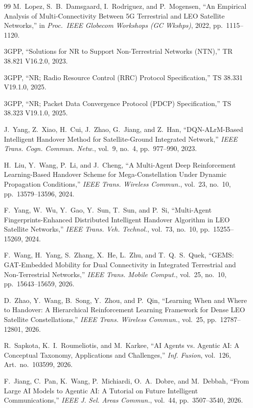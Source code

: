 \documentclass[journal]{IEEEtran}
\begin{document}
\begin{thebibliography}{99}
M.~Lopez, S.~B.~Damsgaard, I.~Rodriguez, and P.~Mogensen, ``An Empirical Analysis of Multi-Connectivity Between 5G Terrestrial and LEO Satellite Networks,'' in \emph{Proc.\ IEEE Globecom Workshops (GC Wkshps)}, 2022, pp.~1115--1120.

3GPP, ``Solutions for NR to Support Non-Terrestrial Networks (NTN),'' TR 38.821 V16.2.0, 2023.

3GPP, ``NR; Radio Resource Control (RRC) Protocol Specification,'' TS 38.331 V19.1.0, 2025.

3GPP, ``NR; Packet Data Convergence Protocol (PDCP) Specification,'' TS 38.323 V19.1.0, 2025.

J.~Yang, Z.~Xiao, H.~Cui, J.~Zhao, G.~Jiang, and Z.~Han, ``DQN-ALrM-Based Intelligent Handover Method for Satellite-Ground Integrated Network,'' \emph{IEEE Trans. Cogn. Commun. Netw.}, vol.~9, no.~4, pp.~977--990, 2023.

H.~Liu, Y.~Wang, P.~Li, and J.~Cheng, ``A Multi-Agent Deep Reinforcement Learning-Based Handover Scheme for Mega-Constellation Under Dynamic Propagation Conditions,'' \emph{IEEE Trans. Wireless Commun.}, vol.~23, no.~10, pp.~13579--13596, 2024.

F.~Yang, W.~Wu, Y.~Gao, Y.~Sun, T.~Sun, and P.~Si, ``Multi-Agent Fingerprints-Enhanced Distributed Intelligent Handover Algorithm in LEO Satellite Networks,'' \emph{IEEE Trans. Veh. Technol.}, vol.~73, no.~10, pp.~15255--15269, 2024.

F.~Wang, H.~Yang, S.~Zhang, X.~He, L.~Zhu, and T.~Q.~S.~Quek, ``GEMS: GAT-Embedded Mobility for Dual Connectivity in Integrated Terrestrial and Non-Terrestrial Networks,'' \emph{IEEE Trans. Mobile Comput.}, vol.~25, no.~10, pp.~15643--15659, 2026.

D.~Zhao, Y.~Wang, B.~Song, Y.~Zhou, and P.~Qin, ``Learning When and Where to Handover: A Hierarchical Reinforcement Learning Framework for Dense LEO Satellite Constellations,'' \emph{IEEE Trans. Wireless Commun.}, vol.~25, pp.~12787--12801, 2026.

R.~Sapkota, K.~I.~Roumeliotis, and M.~Karkee, ``AI Agents vs. Agentic AI: A Conceptual Taxonomy, Applications and Challenges,'' \emph{Inf. Fusion}, vol.~126, Art.~no.~103599, 2026.

F.~Jiang, C.~Pan, K.~Wang, P.~Michiardi, O.~A.~Dobre, and M.~Debbah, ``From Large AI Models to Agentic AI: A Tutorial on Future Intelligent Communications,'' \emph{IEEE J. Sel. Areas Commun.}, vol.~44, pp.~3507--3540, 2026.


\end{thebibliography}
\end{document}
